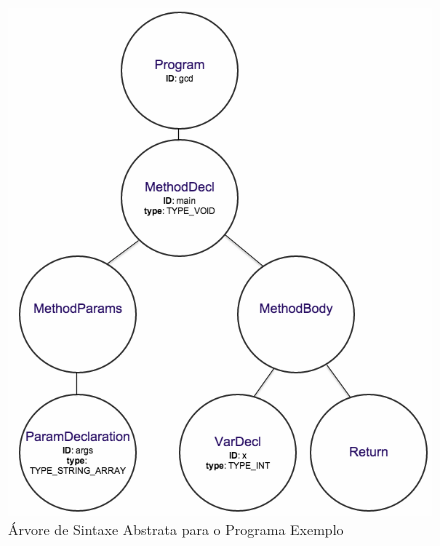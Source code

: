 \documentclass[12pt]{article}
\begin{document}
\begin{figure}[H]
       \centering
       \includegraphics[keepaspectratio=true, scale = 0.5]{arvore.png}
       \caption{Árvore de Sintaxe Abstrata para o Programa Exemplo}
       \end{figure}

 
\end{document}
